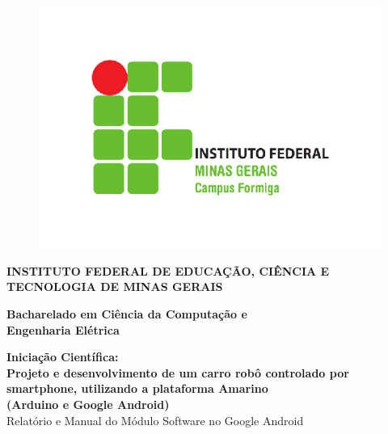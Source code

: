 \documentclass[portugues, brazil, a4paper,12pt]{article}
\begin{document}
\begin{titlepage}

  \vfill

\begin{figure}[H]
  \centering
  \includegraphics[scale=0.45]{logo.jpg}
\end{figure}

  \vfill

  \begin{center}
    \begin{Large}
      \textbf{INSTITUTO FEDERAL DE EDUCAÇÃO, CIÊNCIA E TECNOLOGIA DE MINAS GERAIS}
    \end{Large}
  \end{center}

  \begin{center}
    \begin{large}
      \textbf{Bacharelado em Ciência da Computação e\\ Engenharia Elétrica} \\[1.4cm] 
    \end{large}
  \end{center}

  \vfill

  \begin{center}
    \begin{large}
      \textbf{Iniciação Científica: \\ Projeto e desenvolvimento de um carro robô controlado por smartphone, utilizando a plataforma Amarino \\ (Arduino e Google Android)} \\
      Relatório e Manual do Módulo Software no Google Android
    \end{large}
  \end{center}


\end{titlepage}
\end{document}
